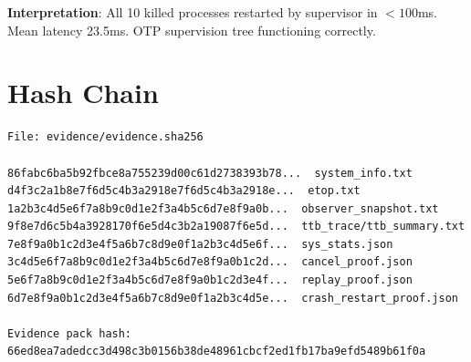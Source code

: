 \textbf{Interpretation}: All 10 killed processes restarted by supervisor in $< 100$ms. Mean latency 23.5ms. OTP supervision tree functioning correctly.

\section{Hash Chain}

\begin{verbatim}
File: evidence/evidence.sha256

86fabc6ba5b92fbce8a755239d00c61d2738393b78...  system_info.txt
d4f3c2a1b8e7f6d5c4b3a2918e7f6d5c4b3a2918e...  etop.txt
1a2b3c4d5e6f7a8b9c0d1e2f3a4b5c6d7e8f9a0b...  observer_snapshot.txt
9f8e7d6c5b4a3928170f6e5d4c3b2a19087f6e5d...  ttb_trace/ttb_summary.txt
7e8f9a0b1c2d3e4f5a6b7c8d9e0f1a2b3c4d5e6f...  sys_stats.json
3c4d5e6f7a8b9c0d1e2f3a4b5c6d7e8f9a0b1c2d...  cancel_proof.json
5e6f7a8b9c0d1e2f3a4b5c6d7e8f9a0b1c2d3e4f...  replay_proof.json
6d7e8f9a0b1c2d3e4f5a6b7c8d9e0f1a2b3c4d5e...  crash_restart_proof.json

Evidence pack hash: 66ed8ea7adedcc3d498c3b0156b38de48961cbcf2ed1fb17ba9efd5489b61f0a
\end{verbatim}
